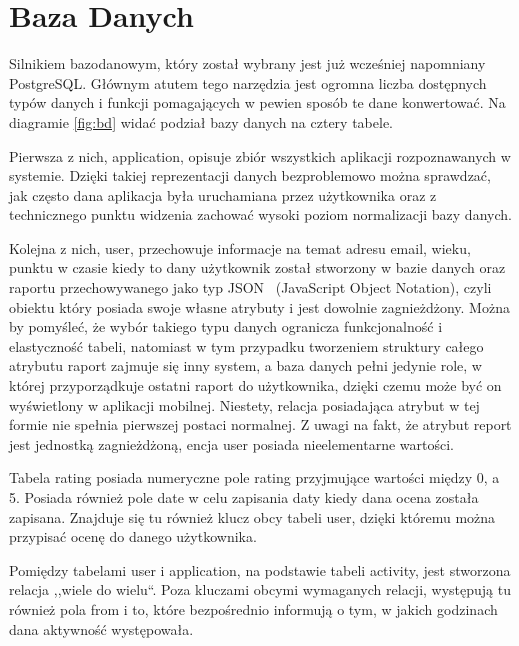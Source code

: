 \documentclass[a4paper,twoside,12pt]{book}
\begin{document}
\section{Baza Danych}
\label{db}
Silnikiem bazodanowym, który został wybrany jest już wcześniej napomniany PostgreSQL. Głównym atutem tego narzędzia jest ogromna liczba dostępnych typów danych i funkcji pomagających w pewien sposób te dane konwertować. Na diagramie \ref{fig:bd} widać podział bazy danych na cztery tabele.

Pierwsza z nich, application, opisuje zbiór wszystkich aplikacji rozpoznawanych w systemie. Dzięki takiej reprezentacji danych bezproblemowo można sprawdzać, jak często dana aplikacja była uruchamiana przez użytkownika oraz z technicznego punktu widzenia zachować wysoki poziom normalizacji bazy danych. 

Kolejna z nich, user, przechowuje informacje na temat adresu email, wieku, punktu w czasie kiedy to dany użytkownik został stworzony w bazie danych oraz raportu przechowywanego jako typ JSON~\cite{psqjson} (JavaScript Object Notation), czyli obiektu który posiada swoje własne atrybuty i jest dowolnie zagnieżdżony. Można by pomyśleć, że wybór takiego typu danych ogranicza funkcjonalność i elastyczność tabeli, natomiast w tym przypadku tworzeniem struktury całego atrybutu raport zajmuje się inny system, a baza danych pełni jedynie role, w której przyporządkuje ostatni raport do użytkownika, dzięki czemu może być on wyświetlony w aplikacji mobilnej. Niestety, relacja posiadająca atrybut w tej formie nie spełnia pierwszej postaci normalnej. Z uwagi na fakt, że atrybut report jest jednostką zagnieżdżoną, encja user posiada nieelementarne wartości. 

Tabela rating posiada numeryczne pole rating przyjmujące wartości między 0, a 5. Posiada również pole date w celu zapisania daty kiedy dana ocena została zapisana. Znajduje się tu również klucz obcy tabeli user, dzięki któremu można przypisać ocenę do danego użytkownika.

Pomiędzy tabelami user i application, na podstawie tabeli activity, jest stworzona relacja ,,wiele do wielu``. Poza kluczami obcymi wymaganych relacji, występują tu również pola from i to, które bezpośrednio informują o tym, w jakich godzinach dana aktywność występowała.
\end{document}
